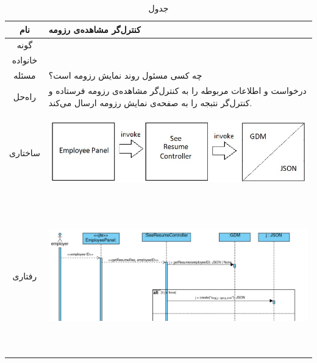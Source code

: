 \begin{table}[H]
	\begin{adjustbox}{width=\textwidth}
		\begin{tabular}{|c|p{\textwidth}|}
			\hline
			نام &
			کنترل‌گر مشاهده‌ی رزومه \\ 
			\hline
			گونه & 
			\grasp \\
			\hline
			خانواده &
			\controller \\
			\hline
			مسئله & 
			چه کسی مسئول روند نمایش رزومه است؟\\
			\hline
			راه‌حل& 
			درخواست و اطلاعات مربوطه را به کنترل‌گر مشاهده‌ی رزومه فرستاده و کنترل‌گر نتبجه را به صفحه‌ی نمایش رزومه ارسال می‌کند. \\
			\hline
			ساختاری & 
			\begin{minipage}{\textwidth}
				\begin{flushleft}
					\begin{minipage}{\textwidth}
						\includegraphics[width=13cm, height=2.7cm]{./images/7-3-1}
					\end{minipage}
				\end{flushleft}
			\end{minipage}
		
			\\
			\hline
			رفتاری & 
			\begin{minipage}{\textwidth}
				\begin{flushleft}
					\begin{minipage}{\textwidth}
						\includegraphics[width=13.5cm, height=6cm]{./images/7-3-2}
					\end{minipage}
				\end{flushleft}
			\end{minipage}
			\\
			\hline
		\end{tabular}
	\end{adjustbox}
	\caption{جدول }
	\label{table-with-pic:3}
\end{table}


